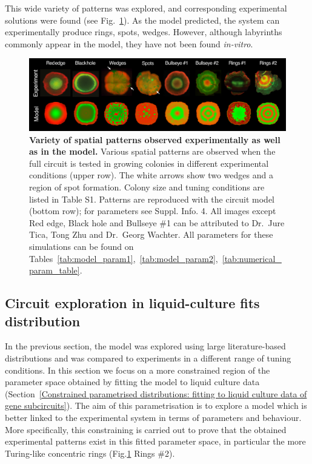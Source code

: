 This wide variety of patterns was explored, and corresponding experimental solutions were found (see Fig.~\ref{comparison_colonies_model_vs_experiment}).
As the model predicted, the system can experimentally produce rings, spots, wedges.
However, although labyrinths commonly appear in the model, they have not been found \textit{in-vitro}.


\begin{figure}[H]
    \centering

    \includegraphics[width=1\textwidth]{chapters/Chapter 3/comparison_colonies_model_vs_experiment}
    \caption{\textbf{Variety of spatial patterns observed experimentally as well as in the model.} Various spatial patterns are observed when the full circuit is tested in growing colonies in different experimental conditions (upper row). The white arrows show two wedges and a region of spot formation. Colony size and tuning conditions are listed in Table S1. Patterns are reproduced with the circuit model (bottom row); for parameters see Suppl. Info. 4. All images except Red edge, Black hole and Bullseye \#1 can be attributed to Dr.~Jure Tica, Tong Zhu and Dr.~Georg Wachter. All parameters for these simulations can be found on Tables~\ref{tab:model_param1},~\ref{tab:model_param2},~\ref{tab:numerical_param_table}. }
    \label{comparison_colonies_model_vs_experiment}
\end{figure}


\subsection{Circuit exploration in liquid-culture fits distribution}
In the previous section, the model was explored using large literature-based distributions and was compared to experiments in a different range of tuning conditions.
In this section we focus on a more constrained region of the parameter space obtained by fitting the model to liquid culture data (Section~\ref{Constrained parametrised distributions: fitting to liquid culture data of gene subcircuits}).
The aim of this parametrisation is to explore a model which is better linked to the experimental system in terms of parameters and behaviour.
More specifically, this constraining is carried out to prove that the obtained experimental patterns exist in this fitted parameter space, in particular the more Turing-like concentric rings (Fig.\ref{comparison_colonies_model_vs_experiment} Rings \#2).


